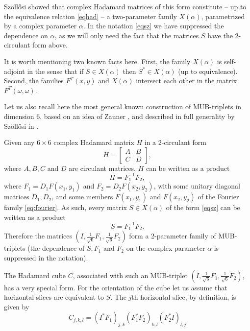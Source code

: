 \documentclass[12pt]{amsart}
\numberwithin{equation}{section}
\theoremstyle{definition}
\theoremstyle{remark}
\theoremstyle{remark}
\begin{document}
Sz\"oll\H osi \cite{Sz} showed that complex Hadamard matrices of this form constitute -- up to the equivalence relation \eqref{eqhad} -- a two-parameter family $X(\alpha)$, parametrized by a complex parameter $\alpha$. In the notation  \eqref{eqsz} we have suppressed the dependence on $\alpha$, as we will only need the fact that the matrices $S$ have the 2-circulant form above. 

\medskip

It is worth mentioning two known facts here. First, the family $X(\alpha)$ is self-adjoint in the sense that if $S\in X(\alpha)$ then $S^\ast\in X(\alpha)$ (up to equivalence). Second, the  families $F^T(x,y)$ and $X(\alpha)$ intersect each other in the matrix $F^T(\omega,\omega)$. 

\medskip

Let us also recall here the most general known construction of MUB-triplets in dimension 6, based on an idea of Zauner \cite{Za}, and described in full generality by Sz\"oll\H osi in \cite{Sz}. 

\medskip

Given any $6\times 6$ complex Hadamard matrix $H$ in a 2-circulant form 
\begin{equation}\label{hb}
H=
\begin{bmatrix}
    A      & B  \\
    C      & D
\end{bmatrix},
\end{equation}
where $A, B, C$ and $D$ are circulant matrices, $H$ can be written as a product
\begin{equation}\label{hff}
H=F_1^{-1}F_2,
\end{equation}
where $F_1=D_1 F(x_1,y_1)$ and $F_2=D_2F(x_2,y_2)$, with some unitary diagonal matrices $D_1, D_2$, and some members $F(x_1,y_1)$ and $F(x_2,y_2)$ of the Fourier family \eqref{eq:fourier}. As such, every matrix $S\in X(\alpha)$ of the form \eqref{eqsz} can be written as a product
\begin{equation}\label{eq:zauner}
S=F_1^{-1}F_2.
\end{equation} Therefore the matrices $(I, \frac{1}{\sqrt{6}}F_1, \frac{1}{\sqrt{6}}F_2)$ form a 2-parameter family of MUB-triplets (the dependence of $S, F_1$ and $F_2$ on the complex parameter $\alpha$ is suppressed in the notation). 


\medskip

The Hadamard cube $C$, associated with such an MUB-triplet $(I, \frac{1}{\sqrt{6}}F_1, \frac{1}{\sqrt{6}}F_2)$, has a very special form. For the orientation of the cube let us assume that horizontal slices are equivalent to $S$. The $j$th horizontal slice, by definition, is given by 
\begin{equation}\label{eq:cjk}
	C_{j,k,l}=(I^* F_1)_{j,k} (F_1^*F_2)_{k,l} (F_2^* I)_{l,j}
\end{equation}
\end{document}
